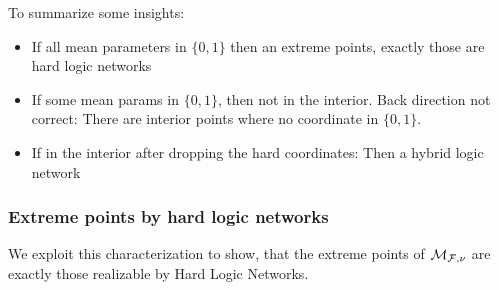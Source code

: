 To summarize some insights:
\begin{itemize}
	\item If all mean parameters in $\{0,1\}$ then an extreme points, exactly those are hard logic networks
	\item If some mean params in $\{0,1\}$, then not in the interior. 
		Back direction not correct: There are interior points where no coordinate in $\{0,1\}$.
	\item If in the interior after dropping the hard coordinates: Then a hybrid logic network
\end{itemize}

\subsubsection{Extreme points by hard logic networks}

We exploit this characterization to show, that the extreme points of $\mathcal{M}_{\mathcal{F},\nu}$ are exactly those realizable by Hard Logic Networks.

